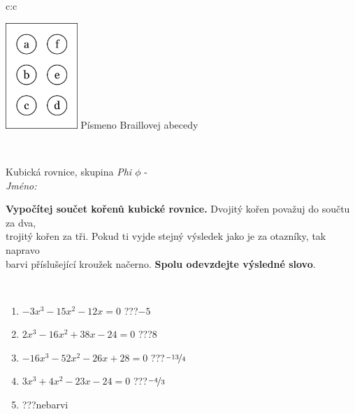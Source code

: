 \documentclass[10pt]{report}
\begin{document}
\begin{tabular}{c:c}
\begin{minipage}[c][104.5mm][t]{0.5\linewidth}
\begin{center}
\begin{minipage}{0.20\linewidth}
\begin{center}
\includegraphics[height=40mm]{../images/braille.png}
{\small Písmeno Braillovej abecedy}
\end{center}
\end{minipage}
\end{center}
\end{minipage}
\\ \hdashline
\begin{minipage}[c][104.5mm][t]{0.5\linewidth}
\begin{center}
\vspace{7mm}
{\huge Kubická rovnice, skupina \textit{Phi $\phi$} -}\\[5mm]
\textit{Jméno:}\phantom{xxxxxxxxxxxxxxxxxxxxxxxxxxxxxxxxxxxxxxxxxxxxxxxxxxxxxxxxxxxxxxxxx}\\[5mm]
\begin{minipage}{0.95\linewidth}
\begin{center}
\textbf{Vypočítej součet kořenů kubické rovnice.} Dvojitý kořen považuj do součtu za dva,\\trojitý kořen za tři. Pokud ti vyjde stejný výsledek jako je za otazníky, tak napravo\\barvi příslušející kroužek načerno. \textbf{Spolu odevzdejte výsledné slovo}.
\end{center}
\end{minipage}
\\[1mm]
\begin{minipage}{0.79\linewidth}
\begin{center}
\begin{varwidth}{\linewidth}
\begin{enumerate}
\Large
\item $-3x^3-15x^2-12x=0$\quad \dotfill\; ???\;\dotfill \quad $-5$
\item $2x^3-16x^2+38x-24=0$\quad \dotfill\; ???\;\dotfill \quad $8$
\item $-16x^3-52x^2-26x+28=0$\quad \dotfill\; ???\;\dotfill \quad $\nicefrac{-13}{4}$
\item $3x^3+4x^2-23x-24=0$\quad \dotfill\; ???\;\dotfill \quad $\nicefrac{-4}{3}$
\item \quad \dotfill\; ???\;\dotfill \quad nebarvi

\end{enumerate}
\end{varwidth}
\end{center}
\end{minipage}
\end{center}
\end{minipage}
\end{tabular}
\end{document}
